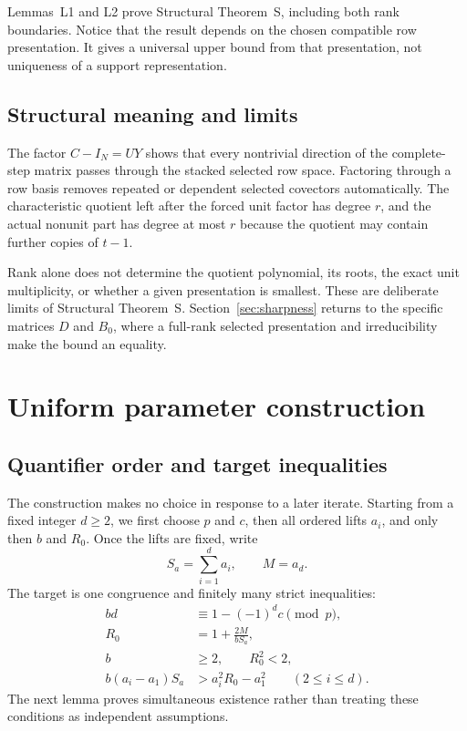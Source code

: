 \documentclass[11pt,letterpaper]{article}
\theoremstyle{plain}
\begin{document}
Lemmas~L1 and L2 prove Structural Theorem~S, including both rank boundaries.  Notice that the result depends on the chosen compatible row presentation.  It gives a universal upper bound from that presentation, not uniqueness of a support representation.

\subsection{Structural meaning and limits}

The factor $C-I_N=UY$ shows that every nontrivial direction of the complete-step matrix passes through the stacked selected row space.  Factoring through a row basis removes repeated or dependent selected covectors automatically.  The characteristic quotient left after the forced unit factor has degree $r$, and the actual nonunit part has degree at most $r$ because the quotient may contain further copies of $t-1$.

Rank alone does not determine the quotient polynomial, its roots, the exact unit multiplicity, or whether a given presentation is smallest.  These are deliberate limits of Structural Theorem~S.  Section~\ref{sec:sharpness} returns to the specific matrices $D$ and $B_0$, where a full-rank selected presentation and irreducibility make the bound an equality.

\section{Uniform parameter construction}
\label{sec:parameters}

\subsection{Quantifier order and target inequalities}

The construction makes no choice in response to a later iterate.  Starting from a fixed integer $d\geq2$, we first choose $p$ and $c$, then all ordered lifts $a_i$, and only then $b$ and $R_0$.  Once the lifts are fixed, write
\[
S_a=\sum_{i=1}^d a_i,\qquad M=a_d.
\]
The target is one congruence and finitely many strict inequalities:
\begin{align*}
bd&\equiv1-(-1)^dc\pmod p,\\
R_0&=1+\frac{2M}{bS_a},\\
b&\geq2,\qquad R_0^2<2,\\
b(a_i-a_1)S_a&>a_i^2R_0-a_1^2\qquad(2\leq i\leq d).
\end{align*}
The next lemma proves simultaneous existence rather than treating these conditions as independent assumptions.
\end{document}
